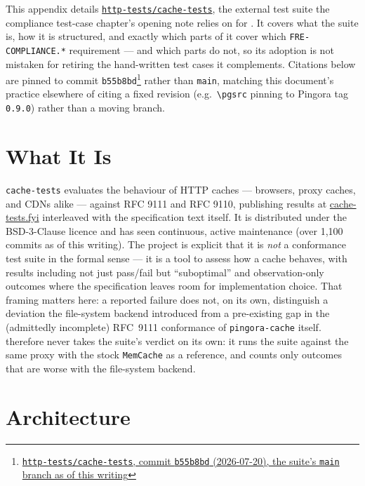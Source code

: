 This appendix details
\href{https://github.com/http-tests/cache-tests}{\texttt{http-tests/cache-tests}},
the external test suite the compliance test-case chapter's opening note
relies on for . It covers what the suite is, how
it is structured, and exactly which parts of it cover which
\texttt{FRE-COMPLIANCE.*} requirement --- and which parts do not, so its
adoption is not mistaken for retiring the hand-written test cases it
complements. Citations below are pinned to commit
\texttt{b55b8bd}\footnote{\href{https://github.com/http-tests/cache-tests/commit/b55b8bda3dbb8c927c04e85bd8d496a8caa3e4ba}{\texttt{http-tests/cache-tests}, commit \texttt{b55b8bd} (2026-07-20), the suite's \texttt{main} branch as of this writing}}
rather than \texttt{main}, matching this document's practice elsewhere of
citing a fixed revision (e.g.\ \texttt{\textbackslash pgsrc} pinning to
Pingora tag \texttt{0.9.0}) rather than a moving branch.

\section{What It Is}

\texttt{cache-tests} evaluates the behaviour of HTTP caches --- browsers,
proxy caches, and CDNs alike --- against RFC 9111 and RFC 9110, publishing
results at \href{https://cache-tests.fyi}{cache-tests.fyi} interleaved with
the specification text itself. It is distributed under the BSD-3-Clause
licence and has seen continuous, active maintenance (over 1,100 commits as of
this writing). The project is explicit that it is \emph{not} a conformance
test suite in the formal sense --- it is a tool to assess how a cache
behaves, with results including not just pass/fail but ``suboptimal'' and
observation-only outcomes where the specification leaves room for
implementation choice. That framing matters here: a reported failure does not,
on its own, distinguish a deviation the file-system backend introduced from a
pre-existing gap in the (admittedly incomplete) RFC~9111 conformance of
\texttt{pingora-cache} itself.  therefore never takes the
suite's verdict on its own: it runs the suite against the same proxy with the
stock \texttt{MemCache} as a reference, and counts only outcomes that are
worse with the file-system backend.

\section{Architecture}

